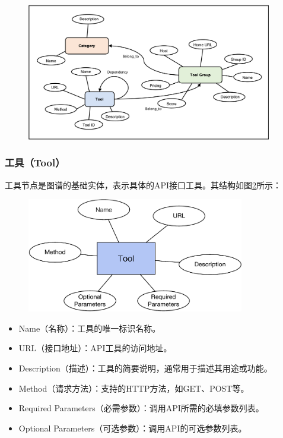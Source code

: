 \begin{figure}[H]
    \vspace{1em}
    \centering
    \setlength{\abovecaptionskip}{10pt} %
    \includegraphics[height=6cm]{../assets/图谱概念模型.png}
    \label{fig:ch3-knowledge-graph-ontology-model}
\end{figure}


\subsubsection{工具（Tool）}

工具节点是图谱的基础实体，表示具体的API接口工具。其结构如图\ref{fig:ch3-kg-tool}所示：

\begin{figure}[H]
    \vspace{1em}
    \centering
    \setlength{\abovecaptionskip}{10pt} %
    \includegraphics[height=5cm]{../assets/图谱格式-tool.pdf}
    \label{fig:ch3-kg-tool}
\end{figure}

\begin{itemize}
    \item Name（名称）：工具的唯一标识名称。
    \item URL（接口地址）：API工具的访问地址。
    \item Description（描述）：工具的简要说明，通常用于描述其用途或功能。
    \item Method（请求方法）：支持的HTTP方法，如GET、POST等。
    \item Required Parameters（必需参数）：调用API所需的必填参数列表。
    \item Optional Parameters（可选参数）：调用API的可选参数列表。
\end{itemize}

